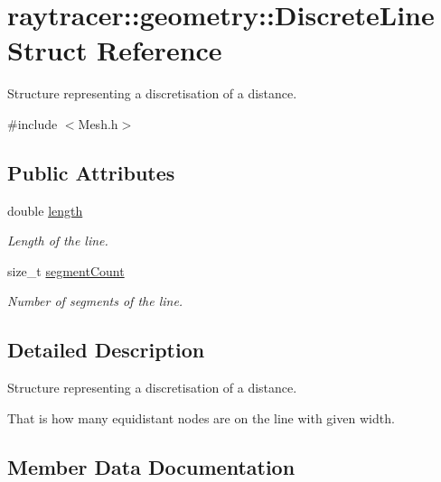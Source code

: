 \hypertarget{structraytracer_1_1geometry_1_1DiscreteLine}{}\section{raytracer\+:\+:geometry\+:\+:Discrete\+Line Struct Reference}
\label{structraytracer_1_1geometry_1_1DiscreteLine}


Structure representing a discretisation of a distance.  




{\ttfamily \#include $<$Mesh.\+h$>$}

\subsection*{Public Attributes}
\begin{DoxyCompactItemize}
\item 
\mbox{\label{structraytracer_1_1geometry_1_1DiscreteLine_aea597ae49804ed604f59a1dbcfe577da}} 
double \hyperlink{structraytracer_1_1geometry_1_1DiscreteLine_aea597ae49804ed604f59a1dbcfe577da}{length}
\begin{DoxyCompactList}\small\item\em Length of the line. \end{DoxyCompactList}\item 
size\+\_\+t \hyperlink{structraytracer_1_1geometry_1_1DiscreteLine_a0657ac3530533ad124a7b6085dfdf928}{segment\+Count}
\begin{DoxyCompactList}\small\item\em Number of segments of the line. \end{DoxyCompactList}\end{DoxyCompactItemize}


\subsection{Detailed Description}
Structure representing a discretisation of a distance. 

That is how many equidistant nodes are on the line with given width. 

\subsection{Member Data Documentation}
\mbox{\label{structraytracer_1_1geometry_1_1DiscreteLine_a0657ac3530533ad124a7b6085dfdf928}} 
